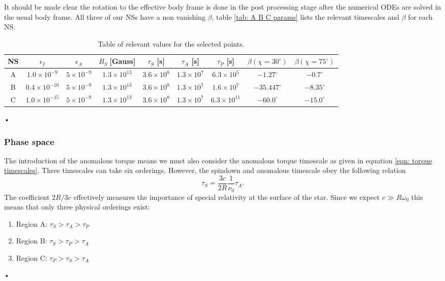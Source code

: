 \documentclass[/home/greg/Thesis/main/main.tex]{subfiles}
\begin{document}
It should be made clear the rotation to the effective body frame is done in the
post processing stage after the numerical ODEs are solved in the usual body
frame. All three of our NSs have a non vanishing $\beta$,  table \ref{tab: A
B C params} lists the relevant timescales and $\beta$ for each NS.
\begin{table}[ht]
{\footnotesize
\centering
	\begin{tabular}[ht]{|c|c|c|c|c|c|c|c|c|}\hline
NS &  $\epsilon_{I}$  & $\epsilon_{A} $ & 	$B_{S} \; $[Gauss] & $\tau_{S}$ [s] & $\tau_{A}$ [s] & $ \tau_{P}$  [s] & $\beta (\chi=30^{\circ})$ & $\beta(\chi=75^{\circ})$ \\ \hline
A & $  1.0\times 10^{-9}  $ & $  5\times 10^{-9}  $ & $  1.3\times 10^{13}  $ & $  3.6\times 10^{8}  $ & $  1.3\times 10^{7}  $ & $  6.3\times 10^{5}  $ & $ -1.27^{\circ} $& $ -0.7^{\circ} $ \\
B & $  0.4\times 10^{-10}  $ & $  5\times 10^{-9}  $ & $  1.3\times 10^{13}  $ & $  3.6\times 10^{8}  $ & $  1.3\times 10^{7}  $ & $  1.6\times 10^{7}  $ & $ -35.447^{\circ} $& $ -8.35^{\circ} $ \\ 
C & $  1.0\times 10^{-15}  $ & $  5\times 10^{-9}  $ & $  1.3\times 10^{13}  $ & $  3.6\times 10^{8}  $ & $  1.3\times 10^{7}  $ & $  6.3\times 10^{11}  $ & $ -60.0^{\circ} $& $ -15.0^{\circ} $ \\ \hline
	\end{tabular}•}
\caption{Table of relevant values for the selected points. }
\label{tab: A B C params beta}
\end{table}




\FloatBarrier
\subsubsection{Phase space}

The introduction of the anomalous torque means we must also consider the
anomalous torque timescale as given in equation \eqref{eqn: torque timescales}. Three
timescales can take six orderings. However, the spindown and anomalous timescale
obey the following relation
\begin{equation}
\tau_{S} = \frac{3c}{2R}\frac{1}{\nu_{0}}\tau_{A}.
\end{equation}
The coefficient $2R/3c$ effectively measures the importance of special
relativity at the surface of the star. Since we expect $c\gg R \omega_{0}$ this
means that only three physical orderings exist:
\begin{enumerate}
\item Region A: $\tau_{S}>\tau_{A}> \tau_{P}$
\item Region B: $\tau_{S}>\tau_{P}> \tau_{A}$
\item Region C: $\tau_{P}>\tau_{S}> \tau_{A}$
\end{enumerate}•
\end{document}
